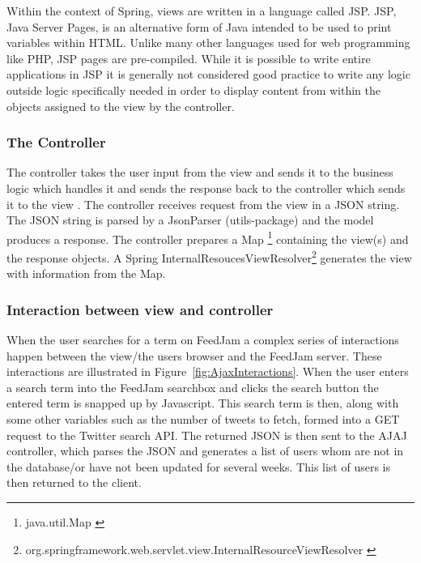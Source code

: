 Within the context of Spring, views are written in a language called JSP. JSP, Java Server Pages, is an alternative form of Java intended to be used to print variables within HTML. Unlike many other languages used for web programming like PHP, JSP pages are pre-compiled. While it is possible to write entire applications in JSP it is generally not considered good practice to write any logic outside logic specifically needed in order to display content from within the objects assigned to the view by the controller.

\subsubsection{The Controller}
The controller takes the user input from the view and sends it to the business logic which handles it and sends the response back to the controller which sends it to the view \citep{Oracle}. The controller receives request from the view in a JSON string. The JSON string is parsed by a JsonParser (utils-package) and the model produces a response. The controller prepares a Map \footnote{java.util.Map \citep{Oraclea}} containing the view(s) and the response objects. A Spring InternalResoucesViewResolver\footnote{org.springframework.web.servlet.view.InternalResourceViewResolver \citep{TheSpring} }  generates the view with information  from the Map.


\subsubsection{Interaction between view and controller} %
\label{viewControllerInteraction}
When the user searches for a term on FeedJam a complex series of interactions happen between the view/the users browser and the FeedJam server. These interactions are illustrated in Figure~\ref{fig:AjaxInteractions}. When the user enters a search term into the FeedJam searchbox and clicks the search button the entered term is snapped up by Javascript. This search term is then, along with some other variables such as the number of tweets to fetch, formed into a GET request to the Twitter search API. The returned JSON is then sent to the AJAJ controller, which parses the JSON and generates a list of users whom are not in the database/or have not been updated for several weeks. This list of users is then returned to the client.

